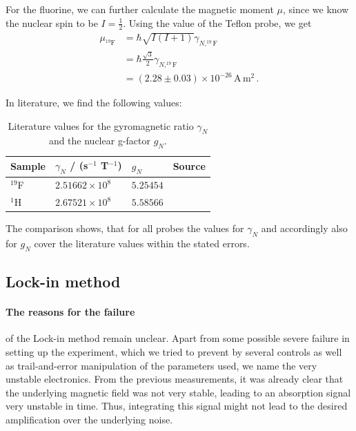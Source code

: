 For the fluorine, we can further calculate the magnetic moment $\mu$, since we know the 
nuclear spin to be $I = \frac{1}{2}$. Using the value of the Teflon probe, we get 
\begin{equation}
    \begin{split}
        \mu_{^{19}\mathrm{F}} &= \hbar \sqrt{I(I + 1)}  \gamma_{N, ^{19}\mathrm{F}} \\
            &= \hbar \frac{\sqrt{3}}{2}  \gamma_{N, ^{19}\mathrm{F}} \\
            &= \left(2.28 \pm 0.03\right) \times 10^{-26} \, \mathrm{A \, m^2}\, .
    \end{split}
\end{equation}

In literature, we find the following values:
\renewcommand{\arraystretch}{1.5}
\begin{table}[H]
\centering
\begin{tabular}{|p{3.82cm}|p{3.82cm}|p{3.82cm}|p{2.00cm}|}
        \hline
        \rowcolor{LightCyan}
        Sample & $\gamma_N$ / (s$^{-1}$ T$^{-1}$) & $g_N$ & Source\\ \hline
        $^{19}$F    & $ 2.51662 \times 10^{8}$  & $ 5.25454$ & \cite{nist}\\ 
        $^1$H       & $ 2.67521 \times 10^{8}$  & $ 5.58566$ & \cite{crc}\\
        \hline
    \end{tabular}
    \caption{
        Literature values for the gyromagnetic ratio $\gamma_N$ and the nuclear g-factor $g_N$.
        }
    \label{tab:lit_val_g}
\end{table}
The comparison shows, that for all probes the values for $\gamma_N$ and accordingly also for 
$g_N$ cover the literature values within the stated errors.



\subsection{Lock-in method}
\paragraph{The reasons for the failure} 
of the Lock-in method remain unclear. Apart from some possible severe 
failure in setting up the experiment, which we tried to prevent by several 
controls as well as trail-and-error manipulation of the parameters used, 
we name the very unstable electronics. From the previous measurements, it was 
already clear that the underlying magnetic field was not very stable, leading 
to an absorption signal very unstable in time. Thus, integrating this signal 
might not lead to the desired amplification over the underlying noise. 

